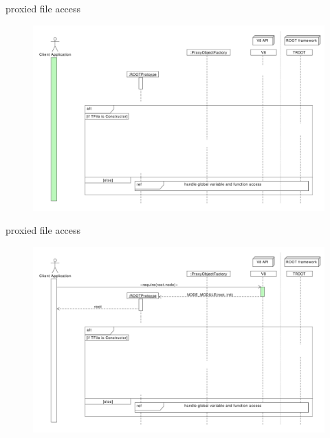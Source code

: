 \begin{frame}{proxied file access}
  \begin{figure}[htb]
    \centering
      \includegraphics[width=\textwidth, height=.85\textheight, keepaspectratio]{./resources/proxycall/fileOpen_h1.pdf}
  \end{figure}
\end{frame}

\begin{frame}{proxied file access}
  \begin{figure}[htb]
    \centering
      \includegraphics[width=\textwidth, height=.85\textheight, keepaspectratio]{./resources/proxycall/fileOpen_h2.pdf}
  \end{figure}
\end{frame}

